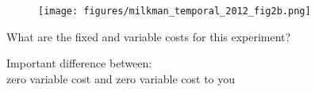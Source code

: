 \documentclass[aspectratio=169]{beamer}
\begin{document}
\begin{frame}

\begin{figure}
  \centering
  \texttt{[image: figures/milkman\_temporal\_2012\_fig2b.png]}
\end{figure}

\end{frame}
\begin{frame}

What are the fixed and variable costs for this experiment?

\end{frame}
\begin{frame}

{\Large
\begin{center}
Important difference between:\\
zero variable cost and zero variable cost to you
\end{center}
}

\end{frame}
\frame{\titlepage}
\end{document}
